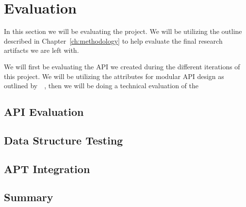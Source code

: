 \documentclass[../Main/thesis.tex]{subfiles}
\begin{document}
\chapter{Evaluation}%
\label{ch:evaluation}
In this section we will be evaluating the project. We will be utilizing the
outline described in Chapter~\ref{ch:methodology} to help evaluate the final
research artifacts we are left with.

We will first be evaluating the API we created during the different iterations
of this project. We will be utilizing the attributes for modular API design as
outlined
by~\citeauthor{Iyer:2012:EAC:2342209.2342213}~\cite{Iyer:2012:EAC:2342209.2342213},
then we will be doing a technical evaluation of the 


\section{API Evaluation}%
\label{sec:api_evaluation}

\section{Data Structure Testing}%
\label{sec:data_structure_testing}

\section{APT Integration}%
\label{sec:apt_integration}


\section{Summary}%
\label{sec:evaluation_summary}


\blankpage
\end{document}
